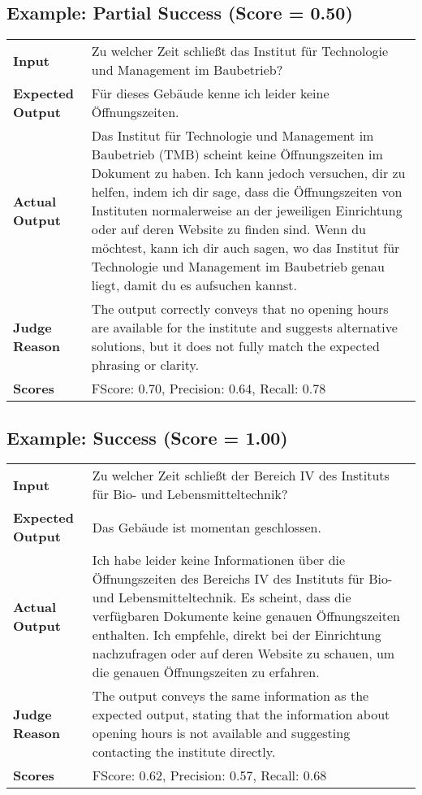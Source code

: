 \documentclass{article}
\begin{document}
\subsection*{Example: Partial Success (Score = 0.50)}
\begin{longtable}{p{} p{}}
\textbf{Input} & Zu welcher Zeit schließt das Institut für Technologie und Management im Baubetrieb? \\
\textbf{Expected Output} & Für dieses Gebäude kenne ich leider keine Öffnungszeiten. \\
\textbf{Actual Output} & Das Institut für Technologie und Management im Baubetrieb (TMB) scheint keine Öffnungszeiten im Dokument zu haben. Ich kann jedoch versuchen, dir zu helfen, indem ich dir sage, dass die Öffnungszeiten von Instituten normalerweise an der jeweiligen Einrichtung oder auf deren Website zu finden sind. Wenn du möchtest, kann ich dir auch sagen, wo das Institut für Technologie und Management im Baubetrieb genau liegt, damit du es aufsuchen kannst. \\
\textbf{Judge Reason} & The output correctly conveys that no opening hours are available for the institute and suggests alternative solutions, but it does not fully match the expected phrasing or clarity. \\
\textbf{Scores} & FScore: 0.70, Precision: 0.64, Recall: 0.78 \\
\end{longtable}
\subsection*{Example: Success (Score = 1.00)}
\begin{longtable}{p{} p{}}
\textbf{Input} & Zu welcher Zeit schließt der Bereich IV des Instituts für Bio- und Lebensmitteltechnik? \\
\textbf{Expected Output} & Das Gebäude ist momentan geschlossen. \\
\textbf{Actual Output} & Ich habe leider keine Informationen über die Öffnungszeiten des Bereichs IV des Instituts für Bio- und Lebensmitteltechnik. Es scheint, dass die verfügbaren Dokumente keine genauen Öffnungszeiten enthalten. Ich empfehle, direkt bei der Einrichtung nachzufragen oder auf deren Website zu schauen, um die genauen Öffnungszeiten zu erfahren. \\
\textbf{Judge Reason} & The output conveys the same information as the expected output, stating that the information about opening hours is not available and suggesting contacting the institute directly. \\
\textbf{Scores} & FScore: 0.62, Precision: 0.57, Recall: 0.68 \\
\end{longtable}
\end{document}
